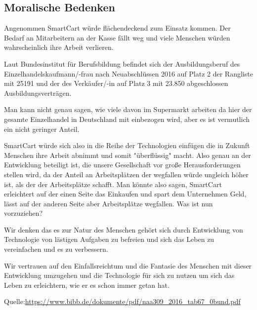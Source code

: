 \documentclass{sigchi}
\begin{document}
\subsection{Moralische Bedenken}
Angenommen SmartCart würde flächendeckend zum Einsatz kommen. 
Der Bedarf an Mitarbeitern an der Kasse fällt weg und viele Menschen würden wahrscheinlich ihre Arbeit verlieren. 

Laut Bundesinstitut für Berufsbildung befindet sich der Ausbildungsberuf des Einzelhandelskaufmann/-frau nach Neuabschlüssen 2016 auf Platz 2 der Rangliste mit 25191 und der des Verkäufer/-in auf Platz 3 mit 23.850 abgeschlossen Ausbildungsverträgen. 

Man kann nicht genau sagen, wie viele davon im Supermarkt arbeiten da hier der gesamte Einzelhandel in Deutschland mit einbezogen wird, aber es ist vermutlich ein nicht geringer Anteil. 

SmartCart würde sich also in die Reihe der Technologien einfügen die in Zukunft Menschen ihre Arbeit abnimmt und somit "überflüssig" macht. Also genau an der Entwicklung beteiligt ist, die unsere Gesellschaft vor große Herausforderungen stellen wird, da der Anteil an Arbeitsplätzen der wegfallen würde ungleich höher ist, als der der Arbeitsplätze schafft. Man könnte also sagen, SmartCart erleichtert auf der einen Seite das Einkaufen und spart dem Unternehmen Geld, lässt auf der anderen Seite aber Arbeitsplätze wegfallen. Was ist nun vorzuziehen? 

Wir denken das es zur Natur des Menschen gehört sich durch Entwicklung von Technologie von lästigen Aufgaben zu befreien und sich das Leben zu vereinfachen und es zu verbessern. 

Wir vertrauen auf den Einfallsreichtum und die Fantasie des Menschen mit dieser Entwicklung umzugehen und die Technologie für sich zu nutzen um sich das Leben zu erleichtern, wie er es schon immer getan hat.  
  
Quelle:\url{https://www.bibb.de/dokumente/pdf/naa309_2016_tab67_0bund.pdf}



\balance{}


%
\end{document}
